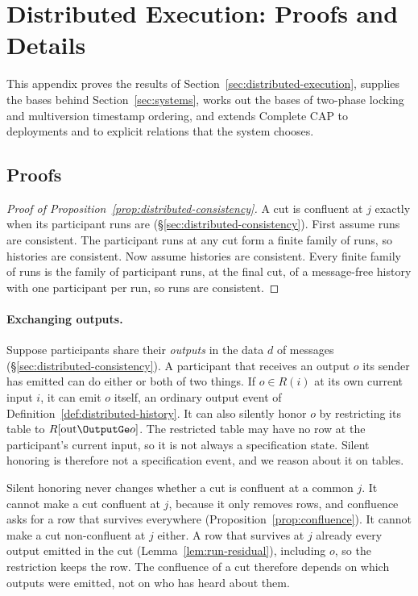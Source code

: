 \section{Distributed Execution: Proofs and Details}
\label{app:proofs-sec4}

This appendix proves the results of Section~\ref{sec:distributed-execution}, supplies the
\commitment bases behind Section~\ref{sec:systems}, works out the bases of two-phase
locking and multiversion timestamp ordering, and extends Complete CAP to deployments and
to explicit relations that the system chooses.

\subsection{Proofs}

\begin{proof}[Proof of Proposition~\ref{prop:distributed-consistency}]
A cut is confluent at $j$ exactly when its participant runs are
(\S\ref{sec:distributed-consistency}).  First assume runs are consistent.  The
participant runs at any cut form a finite family of runs, so histories are
consistent.  Now assume histories are consistent.  Every finite family of runs
is the family of participant runs, at the final cut, of a message-free history
with one participant per run, so runs are consistent.
\end{proof}

\paragraph{Exchanging outputs.}
\label{app:exchanging-outputs}
Suppose participants share their \emph{outputs} in the data $d$ of messages
(\S\ref{sec:distributed-consistency}).  A participant that receives an
output $o$ its sender has emitted can do either or both of two things.  If
$o\in R(i)$ at its own current input $i$, it can emit $o$ itself, an ordinary
output event of Definition~\ref{def:distributed-history}.  It can also
silently honor $o$ by restricting its table to $R[\mathrm{out}\OutputGe o]$.
The restricted table may have no row at the participant's current input, so it
is not always a specification state.  Silent honoring is therefore not a
specification event, and we reason about it on tables.

Silent honoring never changes whether a cut is confluent at a common \indesc
$j$.  It cannot make a cut confluent at $j$, because it only removes rows, and
confluence asks for a row that survives everywhere
(Proposition~\ref{prop:confluence}).  It cannot make a cut non-confluent at
$j$ either.  A row that survives at $j$ already
\outrel every output emitted in the cut (Lemma~\ref{lem:run-residual}),
including $o$, so the restriction keeps the row.  The confluence of a cut
therefore depends on which outputs were emitted, not on who has heard about
them.

